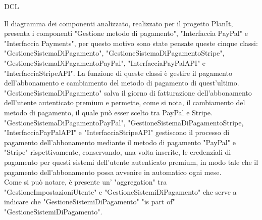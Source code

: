 \begin{listaPersonale}{DCL}
\begin{listaPersonale2}[DCL]{}
        Il diagramma dei componenti analizzato, realizzato per il progetto PlanIt, presenta i componenti "Gestione metodo di pagamento", "Interfaccia PayPal" e "Interfaccia Payments", per questo motivo sono state pensate queste cinque classi: "GestioneSistemaDiPagamento", "GestioneSistemaDiPagamentoStripe", "GestioneSistemaDiPagamentoPayPal", "InterfacciaPayPalAPI" e "InterfacciaStripeAPI". La funzione di queste classi è gestire il pagamento dell'abbonamento e cambiamento del metodo di pagamento di quest'ultimo. \\
        "GestioneSistemaDiPagamento" salva il giorno di fatturazione dell'abbonamento dell'utente autenticato premium e permette, come si nota, il cambiamento del metodo di pagamento, il quale può esser scelto tra PayPal e Stripe.\\
        "GestioneSistemaDiPagamentoPayPal", "GestioneSistemaDiPagamentoStripe, "InterfacciaPayPalAPI" e "InterfacciaStripeAPI" gestiscono il processo di pagamento dell'abbonamento mediante il metodo di pagamento "PayPal" e "Stripe" rispettivamente, conservando, una volta inserite, le credenziali di pagamento per questi sistemi dell'utente autenticato premium, in modo tale che il pagamento dell'abbonamento possa avvenire in automatico ogni mese.\\
        Come si può notare, è presente un' "aggregation" tra "GestioneImpostazioniUtente" e "GestioneSistemiDiPagamento" che serve a indicare che "GestioneSistemiDiPagamento" "is part of" "GestioneSistemiDiPagamento".


        \begin{center}
            
        \end{center}

    \end{listaPersonale2}
    \newpage


\end{listaPersonale}
